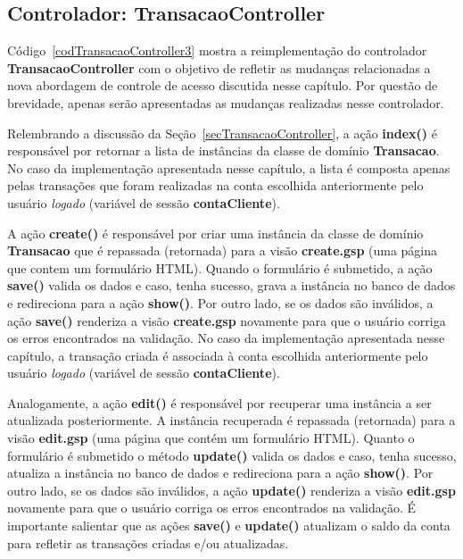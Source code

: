 \subsection{Controlador: TransacaoController}\label{secTransacaoController2}

\vspace{0.5cm}

Código~\ref{codTransacaoController3}  mostra  a  reimplementação do  controlador
{\bf TransacaoController} com o objetivo  de refletir as mudanças relacionadas a
nova abordagem de  controle de acesso discutida nesse  capítulo.  Por questão de
brevidade, apenas serão apresentadas as mudanças realizadas nesse controlador.  

Relembrando  a  discussão  da  Seção~\ref{secTransacaoController}, a  ação  {\bf
  index()} é responsável por retornar a lista de instâncias da classe de domínio
{\bf Transacao}.  No caso da implementação apresentada nesse capítulo, a lista é
composta  apenas  pelas  transações  que  foram realizadas  na  conta  escolhida
anteriormente pelo usuário {\it logado} (variável de sessão {\bf contaCliente}).  

A ação {\bf create()} é responsável por criar uma instância da classe de domínio
{\bf Transacao} que  é repassada (retornada) para a  visão {\bf create.gsp} (uma
página que contem  um formulário HTML). Quando o formulário  é submetido, a ação
{\bf save()} valida  os dados e caso, tenha sucesso, grava  a instância no banco
de dados e  redireciona para a ação  {\bf show()}.  Por outro lado,  se os dados
são inválidos, a ação {\bf  save()} renderiza a visão {\bf create.gsp} novamente
para  que o  usuário  corriga os  erros  encontrados na  validação.  No caso  da
implementação apresentada nesse capítulo, a transação criada é associada à conta
escolhida  anteriormente pelo  usuário  {\it logado}  (variável  de sessão  {\bf
  contaCliente}).  

Analogamente, a  ação {\bf edit()} é  responsável por recuperar  uma instância a
ser atualizada  posteriormente.  A instância recuperada  é repassada (retornada)
para a visão {\bf edit.gsp} (uma página que contém um formulário HTML). Quanto o
formulário é  submetido o método  {\bf update()} valida  os dados e  caso, tenha
sucesso, atualiza a  instância no banco de dados e redireciona  para a ação {\bf
  show()}.  Por  outro lado, se  os dados são  inválidos, a ação  {\bf update()}
renderiza a visão  {\bf edit.gsp} novamente para que o  usuário corriga os erros
encontrados na  validação.  É importante salientar  que as ações  {\bf save()} e
{\bf  update()}  atualizam  o  saldo   da  conta  para  refletir  as  transações
criadas e/ou atualizadas. 

